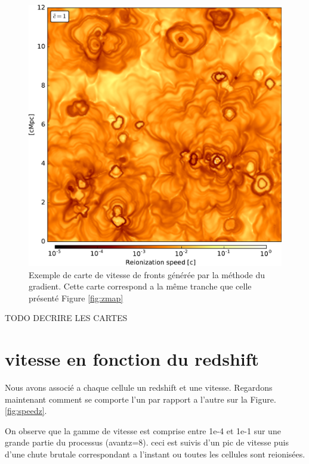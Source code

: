\begin{figure}[htpb]
        \includegraphics[width=.95\linewidth]{img/04_mapreio/map_v_c1.pdf} 
        \caption{Exemple de carte de vitesse de fronts générée par la méthode du gradient.
		 Cette carte correspond a la même tranche que celle présenté Figure \ref{fig:zmap}
        }
 		\label{fig:vmap}
\end{figure}

TODO DECRIRE LES CARTES\\

\section{vitesse en fonction du redshift}
Nous avons associé a chaque cellule un redshift et une vitesse.
Regardons maintenant comment se comporte l'un par rapport a l'autre sur la Figure. \ref{fig:speedz}.

On observe que la gamme de vitesse est comprise entre 1e-4 et 1e-1 sur une grande partie du processus (avantz=8).
ceci est suivis d'un pic de vitesse puis d'une chute brutale correspondant a l'instant ou toutes les cellules sont reionisées.

